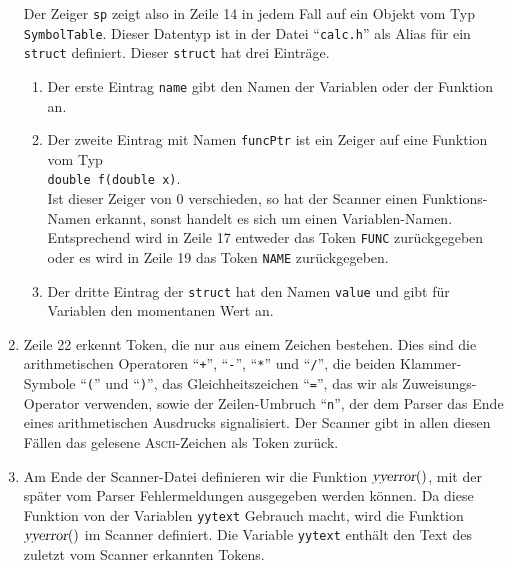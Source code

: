 \begin{enumerate}
      Der Zeiger \texttt{sp} zeigt also in Zeile 14 in jedem Fall auf ein Objekt vom Typ
      \texttt{SymbolTable}.  Dieser Datentyp ist in der Datei ``\texttt{calc.h}'' als
      Alias f\"ur ein \texttt{struct} definiert.  Dieser \texttt{struct} hat drei
      Eintr\"age. 
      \begin{enumerate}
      \item Der erste Eintrag \texttt{name} gibt den Namen der Variablen oder
            der Funktion an.  
      \item Der zweite Eintrag mit Namen \texttt{funcPtr} ist ein Zeiger
            auf eine Funktion vom Typ
            \\[0.2cm]
            \hspace*{1.3cm} \texttt{double f(double x)}.
            \\[0.2cm]
            Ist dieser Zeiger von 0 verschieden, so hat der Scanner einen Funktions-Namen 
            erkannt, sonst handelt es sich um einen Variablen-Namen.  Entsprechend wird in
            Zeile 17 entweder das Token \texttt{FUNC} zur\"uckgegeben oder es wird in Zeile 19
            das Token \texttt{NAME} zur\"uckgegeben.
      \item Der dritte Eintrag der \texttt{struct} hat den Namen \texttt{value} und gibt f\"ur
            Variablen den momentanen Wert an.
      \end{enumerate}
\item Zeile 22 erkennt Token, die nur aus einem Zeichen bestehen.  Dies sind die
      arithmetischen Operatoren ``\texttt{+}'', ``\texttt{-}'', ``\texttt{*}'' und
      ``\texttt{/}'', die beiden Klammer-Symbole ``\texttt{(}'' und ``\texttt{)}'', das
      Gleichheitszeichen ``\texttt{=}'', das wir als Zuweisungs-Operator verwenden, sowie
      der Zeilen-Umbruch ``\texttt{n}'', der dem Parser das Ende eines
      arithmetischen Ausdrucks signalisiert.  Der Scanner gibt in allen diesen F\"allen das
      gelesene \textsc{Ascii}-Zeichen als Token zur\"uck.
\item Am Ende der Scanner-Datei definieren wir die Funktion $\textsl{yyerror}()$, mit
      der sp\"ater vom Parser Fehlermeldungen ausgegeben werden k\"onnen.  Da diese Funktion
      von der Variablen \texttt{yytext} Gebrauch macht, wird die Funktion
      $\textsl{yyerror}()$ im Scanner definiert.  Die Variable \texttt{yytext} enth\"alt den
      Text des zuletzt vom Scanner erkannten Tokens.
\end{enumerate}


